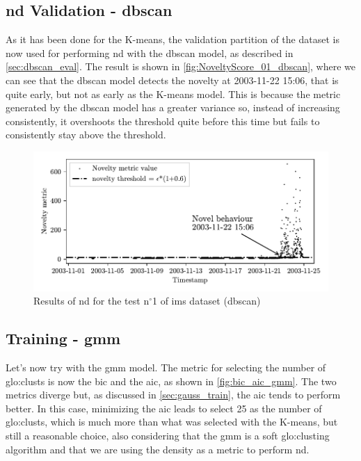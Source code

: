 \subsection{\gls{nd} Validation - \gls{dbscan}}
As it has been done for the K-means, the validation partition of the dataset is now used for performing \gls{nd} with the \gls{dbscan} model, as described in \autoref{sec:dbscan_eval}. The result is shown in \autoref{fig:NoveltyScore_01_dbscan}, where we can see that the \gls{dbscan} model detects the novelty at 2003-11-22 15:06, that is quite early, but not as early as the K-means model. This is because the metric generated by the \gls{dbscan} model has a greater variance so, instead of increasing consistently, it overshoots the threshold quite before this time but fails to consistently stay above the threshold. 

\begin{figure}
    \centering
    \includegraphics{images/IMS/Novelty_01_500samples_bearing3x_dbscan.pdf}
    \caption{Results of \gls{nd} for the test $\text{n}^\circ$1 of \gls{ims} dataset (\gls{dbscan})}
    \label{fig:NoveltyScore_01_dbscan}
\end{figure}

\subsection{Training - \gls{gmm}}
Let's now try with the \gls{gmm} model. The metric for selecting the number of \gls{glo:clust}s is now the \gls{bic} and the \gls{aic}, as shown in \autoref{fig:bic_aic_gmm}. The two metrics diverge but, as discussed in \autoref{sec:gauss_train}, the \gls{aic} tends to perform better. In this case, minimizing the \gls{aic} leads to select 25 as the number of \gls{glo:clust}s, which is much more than what was selected with the K-means, but still a reasonable choice, also considering that the \gls{gmm} is a soft \gls{glo:clust}ing algorithm and that we are using the density as a metric to perform \gls{nd}.

